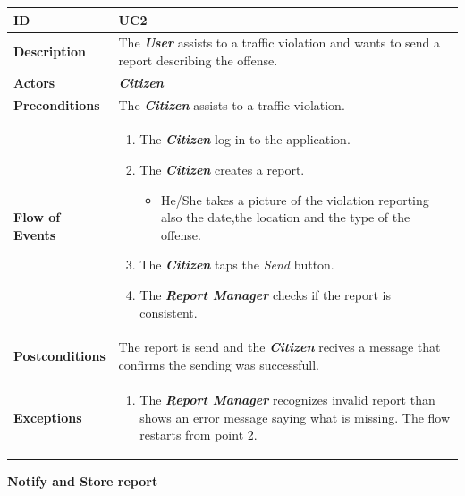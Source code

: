\documentclass{report}
\begin{document}
\begin{tabularx}{\linewidth}{| l | X |}
	\hline
	\textbf{ID} & UC2\\
	
	\hline
	\textbf{Description} & The \textbf{\textit{User}} assists to a traffic violation and wants to send a report describing the offense.\\
	
	\hline
	\textbf{Actors} & \textbf{\textit{Citizen}}\\
	
	\hline
	\textbf{Preconditions} & The \textbf{\textit{Citizen}} assists to a traffic violation.\\
	
	\hline
	\textbf{Flow of Events} & \parbox{0.7\textwidth}{\begin{enumerate}
			\item The \textbf{\textit{Citizen}} log in to the application.
			
			\item The \textbf{\textit{Citizen}} creates a report.
			\begin{itemize}
			\item He/She takes a picture of the violation reporting also the date,the location and the type of the offense.			
			\end{itemize}
			\item The \textbf{\textit{Citizen}} taps the \textit{Send} button.	
			\item The \textbf{\textit{Report Manager}} checks if the report is consistent.		
			
	\end{enumerate}}\\
	
	\hline
	\textbf{Postconditions} & The report is send and the \textbf{\textit{Citizen}} recives a message that confirms the sending was successfull.\\
	
	\hline
	\textbf{Exceptions} & \parbox{0.7\textwidth}{ \begin{enumerate}
			\item The \textbf{\textit{Report Manager}} recognizes invalid report than shows an error message saying what is missing. The flow restarts from point 2. 
		\end{enumerate}}\\
	
	\hline
	
\end{tabularx}
\begin{center}
	\textbf{Notify and Store report}
\end{center}
\end{document}
